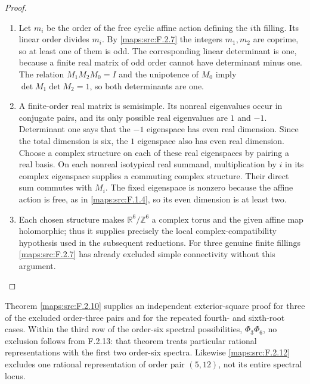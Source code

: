 \documentclass[11pt,a4paper]{article}
\theoremstyle{definition}
\begin{document}
\begin{proof}
\begin{enumerate}[label=\arabic*.]
\item Let $m_i$ be the order of the free cyclic affine action
defining the $i$th filling.  Its linear order divides $m_i$.
By \ref{maps:src:F.2.7} the integers $m_1,m_2$ are coprime, so at least one
of them is odd.  The corresponding linear determinant is
one, because a finite real matrix of odd order cannot have
determinant minus one.  The relation
$M_1M_2M_0=I$ and the unipotence of $M_0$ imply
$\det M_1\det M_2=1$, so both determinants are one.

\item A finite-order real matrix is semisimple.  Its nonreal
eigenvalues occur in conjugate pairs, and its only possible
real eigenvalues are $1$ and $-1$.  Determinant one says
that the $-1$ eigenspace has even real dimension.  Since the
total dimension is six, the $1$ eigenspace also has even
real dimension.  Choose a complex structure on each of
these real eigenspaces by pairing a real basis.  On each
nonreal isotypical real summand, multiplication by $i$ in
its complex eigenspace supplies a commuting complex
structure.  Their direct sum commutes with $M_i$.
The fixed eigenspace is nonzero because the affine action
is free, as in \ref{maps:src:F.1.4}, so its even dimension is at least two.

\item Each chosen structure makes $\mathbb R^6/\mathbb Z^6$ a
complex torus and the given affine map holomorphic; thus it
supplies precisely the local complex-compatibility
hypothesis used in the subsequent reductions.  For three genuine
finite fillings \ref{maps:src:F.2.7} has already excluded simple
connectivity without this argument.

\end{enumerate}
\end{proof}


Theorem \ref{maps:src:F.2.10} supplies an independent exterior-square
proof for three of the excluded order-three pairs and for
the repeated fourth- and sixth-root cases.
Within the third row of the order-six spectral possibilities,
$\Phi_3\Phi_6$, no exclusion follows from F.2.13: that theorem
treats particular rational representations with the first
two order-six spectra.  Likewise \ref{maps:src:F.2.12} excludes one
rational representation of order pair $(5,12)$, not its
entire spectral locus.
\end{document}
